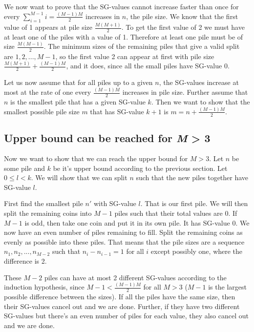 \documentclass[english,a4paper,twoside]{amsart}
\theoremstyle{definition}
\begin{document}
We now want to prove that the SG-values cannot increase faster than once for every
$\sum_{i=1}^{M-1} i = \frac{(M-1)M}{2}$ increases in $n$, the pile size. We know that the first value
of 1 appears at pile size $\frac{M(M+1)}{2}$. To get the first value of 2 we must have at least one of the piles
with a value of 1. Therefore at least one pile must be of size $\frac{M(M-1)}{2}$. The minimum sizes of
the remaining piles that give a valid split are $1, 2, ..., M-1$, so the first value 2 can appear at
first with pile size $\frac{M(M+1)}{2} + \frac{(M-1)M}{2}$, and it does, since all the small piles
have SG-value 0.

Let us now assume that for all piles up to a given $n$, the SG-values increase at most at the rate
of one every $\frac{(M-1)M}{2}$ increases in pile size. Further assume that $n$ is the smallest pile
that has a given SG-value $k$. Then we want to show that the smallest possible pile size $m$ that has
SG-value $k+1$ is $m = n+\frac{(M-1)M}{2}$.

\subsection{Upper bound can be reached for \emph{M} > 3}
Now we want to show that we can reach the upper bound for $M > 3$. Let $n$ be some pile and $k$ be
it's upper bound according to the previous section. Let $0 \leq l < k$. We will show that we can
split $n$ such that the new piles together have SG-value $l$.

First find the smallest pile $n'$ with SG-value $l$. That is our first pile. We will then split the
remaining coins into $M-1$ piles such that their total values are 0. If $M-1$ is odd, then take
one coin and put it in its own pile. It has SG-value 0. We now have an even number of piles remaining
to fill. Split the remaining coins as evenly as possible into these piles. That means that the
pile sizes are a sequence $n_1, n_2, ..., n_{M-2}$ such that $n_i - n_{i-1} = 1$ for all $i$ except
possibly one, where the difference is 2.

These $M-2$ piles can have at most 2 different SG-values according to the induction hypothesis,
since $M-1 < \frac{(M-1)M}{2}$ for all $M > 3$ ($M-1$ is the largest possible difference between the sizes).
If all the piles have the same size, then their SG-values cancel out and we are done.
Further, if they have two different SG-values but there's an even number of piles for each value, they
also cancel out and we are done.
\end{document}
